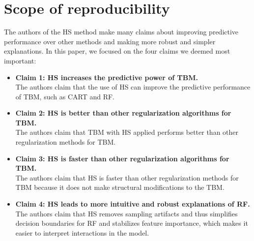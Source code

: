 \section{Scope of reproducibility}
\label{sec:claims}


The authors of the HS method make many claims about improving predictive performance over other methods and making more robust and simpler explanations. In this paper, we focused on the four claims we deemed most important:

\begin{itemize}
    \item \textbf{Claim 1: HS increases the predictive power of TBM.} \\ The authors claim that the use of HS can improve the predictive performance of TBM, such as CART and RF.
    \item \textbf{Claim 2: HS is better than other regularization algorithms for TBM.} \\ The authors claim that TBM with HS applied performs better than other regularization methods for TBM.
    \item \textbf{Claim 3: HS is faster than other regularization algorithms for TBM.} \\ The authors claim that HS is faster than other regularization methods for TBM because it does not make structural modifications to the TBM.
    \item \textbf{Claim 4: HS leads to more intuitive and robust explanations of RF.} \\ The authors claim that HS removes sampling artifacts and thus simplifies decision boundaries for RF and stabilizes feature importance, which makes it easier to interpret interactions in the model.
\end{itemize}


